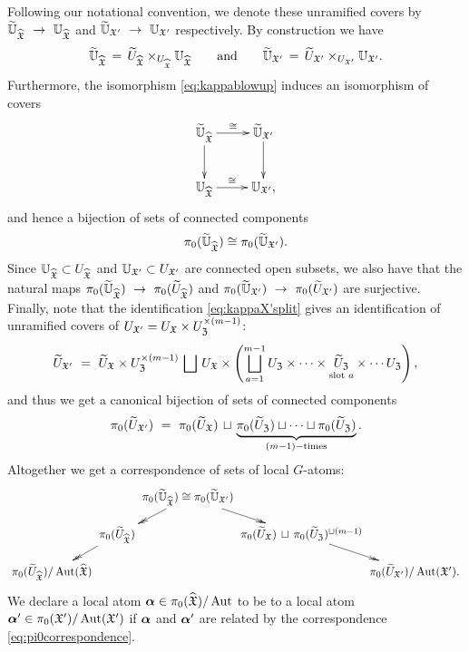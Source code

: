 \documentclass[twoside,leqno]{article}
\numberwithin{equation}{section}
\theoremstyle{plain}
\theoremstyle{definition}
\begin{document}
Following our notational convention, we denote these unramified covers by 
$\widetilde{\maxeigbup}_{\widehat{\fX}} \ \to \ \maxeigbup_{\widehat{\fX}}$ and 
$\widetilde{\maxeigbup}_{\fX'} \ \to \ \maxeigbup_{\fX'}$ respectively. By construction we have
\[
\widetilde{\mathbb{U}}_{\widehat{\mathfrak X}} \, = \, \widetilde{U}_{\widehat{\mathfrak X}} \times_{U_{\widehat{\mathfrak X}}} \mathbb{U}_{\widehat{\mathfrak X}} \qquad \text{and} \qquad 
\widetilde{\mathbb{U}}_{\mathfrak X'} \, = \, \widetilde{U}_{\mathfrak X'} \times_{U_{\mathfrak X'}} 
\mathbb{U}_{\mathfrak X'}.
\]
Furthermore, the isomorphism \eqref{eq:kappablowup} induces an isomorphism of covers
\[
\xymatrix{\widetilde{\maxeigbup}_{\widehat{\fX}} \ar[d] \ar[r]^-{\cong} & 
\widetilde{\maxeigbup}_{\fX'}  \ar[d] \\
\maxeigbup_{\widehat{\fX}} \ar[r]^-{\cong} & \maxeigbup_{\fX'},
}
\]
and hence a bijection  of sets of connected components
\[
\pi_{0}(\widetilde{\mathbb{U}}_{\widehat{\mathfrak X}}) \cong  \pi_{0}(\widetilde{\mathbb{U}}_{\mathfrak X'}).
\]
Since $\mathbb{U}_{\widehat{\mathfrak X}} \subset U_{\widehat{\mathfrak X}}$ and 
$\mathbb{U}_{\mathfrak X'} \subset U_{\mathfrak X'}$ are connected open subsets, we also have that the natural maps $\pi_{0}(\widetilde{\maxeigbup}_{\widehat{\fX}}) \ \to \ 
\pi_{0}(\widetilde{U}_{\widehat{\fX}})$ and 
$\pi_{0}(\widetilde{\maxeigbup}_{\fX'}) \ \to \ 
\pi_{0}(\widetilde{U}_{\fX'})$ are surjective. 
Finally, note that the identification \eqref{eq:kappaX'split} gives an identification of unramified covers of $U_{\mathfrak X'} = U_{\mathfrak X}\times U_{\mathfrak Z}^{\times (m-1)}$:
\[
\widetilde{U}_{\fX'} \ = \ \widetilde{U}_{\fX}\times U_{\fZ}^{\times (m-1)} \, \bigsqcup \, 
U_{\fX} \times \left(\bigsqcup_{a = 1}^{m-1} U_{\fZ}\times \cdots \times \underset{\text{slot } a}{\widetilde{U}_{\fZ}} \times \cdots U_{\fZ}\right),
\]
and thus we get a canonical bijection of sets of connected components
\[
\pi_{0}(\widetilde{U}_{\fX'}) \ = \ \pi_{0}(\widetilde{U}_{\fX})\, \sqcup \, \underbrace{\pi_{0}(\widetilde{U}_{\fZ}) \sqcup \cdots \sqcup \pi_{0}(\widetilde{U}_{\fZ})}_{(m-1)-\text{times}}.
\]
Altogether we get a correspondence of sets of local $G$-atoms:
\begin{equation} \label{eq:pi0correspondence}
\xymatrix@C-2pc@R-1pc{
& & \pi_{0}(\widetilde{\maxeigbup}_{\widehat{\fX}}) \cong  \pi_{0}(\widetilde{\maxeigbup}_{\fX'}) \ar@{->>}[dl] \ar@{->>}[dr] & & \\
& \pi_{0}(\widetilde{U}_{\widehat{\fX}}) \ar@{->>}[dl] & & \pi_{0}(\widetilde{U}_{\fX})\, \sqcup \, \pi_{0}(\widetilde{U}_{\fZ})^{\sqcup (m-1)} \ar@{->>}[dr] & \\
\pi_{0}(\widetilde{U}_{\widehat{\fX}})/\op{Aut}(\widehat{\fX}) & & & & 
\pi_{0}(\widetilde{U}_{\fX'})/\op{Aut}(\fX').
}
\end{equation}
We declare a local atom $\boldsymbol{\alpha} \in \pi_{0}(\widehat{\mathfrak X})/\operatorname{Aut}$ to be  to a local atom $\boldsymbol{\alpha}' \in \pi_{0}(\mathfrak X')/\operatorname{Aut}(\mathfrak X')$ if $\boldsymbol{\alpha}$ and $\boldsymbol{\alpha}'$ are related by the correspondence 
\eqref{eq:pi0correspondence}.
\end{document}
